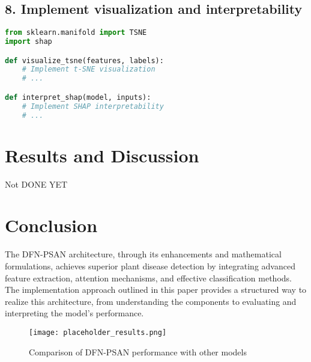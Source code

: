 \documentclass[12pt,a4paper]{article}
\begin{document}
\subsection{8. Implement visualization and interpretability}
\begin{lstlisting}[language=Python, caption=Visualization and Interpretability]
from sklearn.manifold import TSNE
import shap

def visualize_tsne(features, labels):
    # Implement t-SNE visualization
    # ...

def interpret_shap(model, inputs):
    # Implement SHAP interpretability
    # ...
\end{lstlisting}

\section{Results and Discussion}
Not DONE YET

\section{Conclusion}
The DFN-PSAN architecture, through its enhancements and mathematical formulations, achieves superior plant disease detection by integrating advanced feature extraction, attention mechanisms, and effective classification methods. The implementation approach outlined in this paper provides a structured way to realize this architecture, from understanding the components to evaluating and interpreting the model's performance.

\begin{figure}[H]
\centering
\texttt{[image: placeholder\_results.png]}
\caption{Comparison of DFN-PSAN performance with other models}
\label{fig:results_comparison}
\end{figure}

\end{document}
